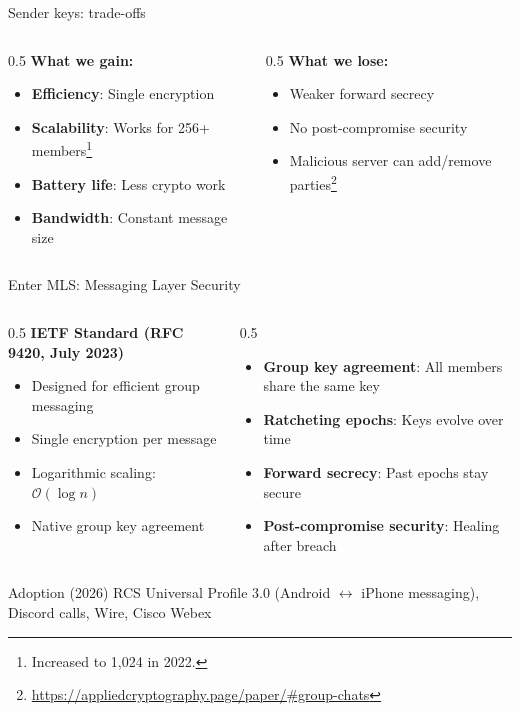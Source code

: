 \ifdefined\PRESENTATION\else\PassOptionsToClass{handout}{beamer}\fi\documentclass[aspectratio=169, lualatex]{beamer}
\begin{document}
\begin{frame}{Sender keys: trade-offs}
	\begin{columns}[c]
		\begin{column}{0.5\textwidth}
			\textbf{What we gain:}
			\begin{itemize}
				\item \textbf{Efficiency}: Single encryption
				\item \textbf{Scalability}: Works for 256+ members\footnote{Increased to 1,024 in 2022.}
				\item \textbf{Battery life}: Less crypto work
				\item \textbf{Bandwidth}: Constant message size
			\end{itemize}
		\end{column}
		\begin{column}{0.5\textwidth}
			\textbf{What we lose:}
			\begin{itemize}
				\item Weaker forward secrecy
				\item No post-compromise security
				\item Malicious server can add/remove parties\footnote{\url{https://appliedcryptography.page/paper/\#group-chats}}
			\end{itemize}
		\end{column}
	\end{columns}
\end{frame}

\begin{frame}{Enter MLS: Messaging Layer Security}
	\begin{columns}[c]
		\begin{column}{0.5\textwidth}
			\textbf{IETF Standard (RFC 9420, July 2023)}
			\begin{itemize}
				\item Designed for efficient group messaging
				\item Single encryption per message
				\item Logarithmic scaling: $\mathcal{O}(\log n)$
				\item Native group key agreement
			\end{itemize}
		\end{column}
		\begin{column}{0.5\textwidth}
			\begin{itemize}
				\item \textbf{Group key agreement}: All members share the same key
				\item \textbf{Ratcheting epochs}: Keys evolve over time
				\item \textbf{Forward secrecy}: Past epochs stay secure
				\item \textbf{Post-compromise security}: Healing after breach
			\end{itemize}
		\end{column}
	\end{columns}
	\begin{exampleblock}{Adoption (2026)}
		RCS Universal Profile 3.0 (Android $\leftrightarrow$ iPhone messaging), Discord calls, Wire, Cisco Webex
	\end{exampleblock}
\end{frame}
\end{document}
